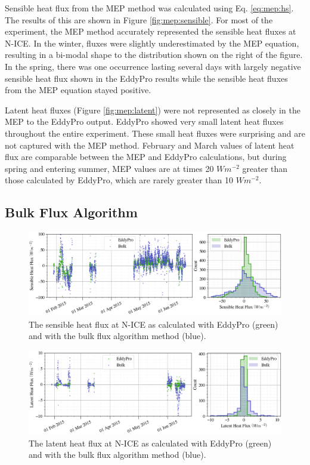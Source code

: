 Sensible heat flux from the MEP method was calculated using Eq. \ref{eq:mep:hs}. The results of this are shown in Figure \ref{fig:mep:sensible}. For most of the experiment, the MEP method accurately represented the sensible heat fluxes at N-ICE. In the winter, fluxes were slightly underestimated by the MEP equation, resulting in a bi-modal shape to the distribution shown on the right of the figure. In the spring, there was one occurrence lasting several days with largely negative sensible heat flux shown in the EddyPro results while the sensible heat fluxes from the MEP equation stayed positive. 

Latent heat fluxes (Figure \ref{fig:mep:latent}) were not represented as closely in the MEP to the EddyPro output. EddyPro showed very small latent heat fluxes throughout the entire experiment. These small heat fluxes were surprising and are not captured with the MEP method. February and March values of latent heat flux are comparable between the MEP and EddyPro calculations, but during spring and entering summer, MEP values are at times 20 $Wm^{-2}$ greater than those calculated by EddyPro, which are rarely greater than 10 $Wm^{-2}$.

 \subsection{Bulk Flux Algorithm}
\begin{figure}[H]
    \centering
    \includegraphics[width=1\linewidth]{figures/chapter5/BulkSensible.png}
    \caption[Sensible heat flux from a bulk flux method compared to EddyPro]{The sensible heat flux at N-ICE as calculated with EddyPro (green) and with the bulk flux algorithm method (blue).}
    \label{fig:bulk:sensible}
\end{figure}
\begin{figure}[H]
    \centering
    \includegraphics[width=1\linewidth]{figures/chapter5/BulkLatent.png}
    \caption[Latent heat flux from a bulk flux method compared to EddyPro]{The latent heat flux at N-ICE as calculated with EddyPro (green) and with the bulk flux algorithm method (blue).}
    \label{fig:bulk:latent}
\end{figure}


